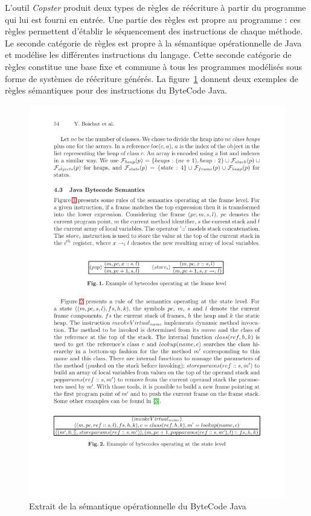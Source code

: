 L'outil \emph{Copster} produit deux types de règles de réécriture à
partir du programme qui lui est fourni en entrée. Une partie des règles est propre
au programme : ces règles permettent d'établir le séquencement des
instructions de chaque méthode. Le seconde catégorie de règles est
propre à la sémantique opérationnelle de Java et modélise les
différentes instructions du langage.
Cette seconde catégorie de règles constitue une base fixe et commune à tous
les programmes modélisés sous forme de systèmes de réécriture générés.
La figure~\ref{fig:semantique-java} donnent deux exemples de règles
sémantiques pour des instructions du ByteCode Java.

\begin{figure}[ht!]
  \centering
  \includegraphics[scale=1.3]{jvm_1}
  \caption{\footnotesize Extrait de la sémantique opérationnelle du ByteCode Java}
  \label{fig:semantique-java}
\end{figure}

